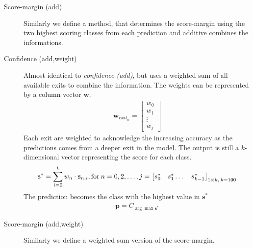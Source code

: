 \begin{description}
	\item[Score-margin (add)] Similarly we define a method, that determines the score-margin using the two highest scoring classes from each prediction and additive combines the informations.
	\item[Confidence (add,weight)] Almost identical to \emph{confidence (add)}, but uses a weighted sum of all available exits to combine the information. The weights can be represented by a column vector $\mathbf{w}$.
	\begin{align*}
		\mathbf{w}_{exit_n} =
		\begin{bmatrix}
			w_0 \\
			w_1 \\
			\vdots \\
			w_j
		\end{bmatrix}
	\end{align*}
	Each exit are weighted to acknowledge the increasing accuracy as the predictions comes from a deeper exit in the model. The output is still a $k$-dimensional vector representing the score for each class. 
	\begin{align*}
	\mathbf{s^*} = \sum_{i=0}^{k} w_n \cdot \mathbf{s}_{n,i} , \text{for\:} n=0, 2, \dots, j = 		
	\begin{bmatrix}
	s^*_0 & s^*_1 \dots & s^*_{k-1}
	\end{bmatrix}_{1 \times k,\: k=100} 
	\end{align*}
	The prediction becomes the class with the highest value in $\mathbf{s^*}$
	\begin{align*}
	\mathbf{p} = C_{\arg \max \mathbf{s^*}}
	\end{align*}
	
	\item[Score-margin (add,weight)] Similarly we define a weighted sum version of the score-margin. 
\end{description}

